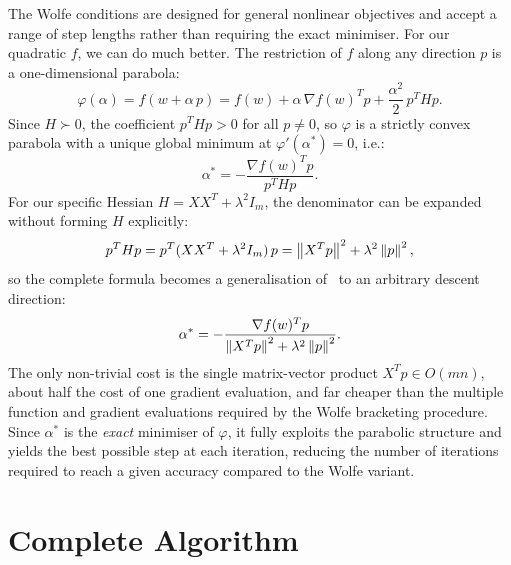 \noindent The Wolfe conditions are designed for general nonlinear objectives and
accept a range of step lengths rather than requiring the exact minimiser. For our
quadratic $f$, we can do much better. The restriction of $f$ along any direction
$p$ is a one-dimensional parabola:
\begin{equation}
\label{eq:phi_parabola}
    \varphi(\alpha) = f(w + \alpha\,p)
    = f(w) + \alpha\,\nabla f(w)^T p + \frac{\alpha^2}{2}\,p^T H p.
\end{equation}
Since $H \succ 0$, the coefficient $p^T H p > 0$ for all $p \neq 0$, so
$\varphi$ is a strictly convex parabola with a unique global minimum at
$\varphi'(\alpha^*) = 0$, i.e.:
\begin{equation}
\label{eq:exact_alpha}
    \alpha^* = -\frac{\nabla f(w)^T p}{\,p^T H p\,}.
\end{equation}
For our specific Hessian $H = XX^T + \lambda^2 I_m$, the denominator can be
expanded without forming $H$ explicitly:
\begin{equation}
    p^T H p = p^T (XX^T + \lambda^2 I_m)\,p
    = \left\|X^T p\right\|^2 + \lambda^2\left\|p\right\|^2,
\end{equation}
so the complete formula becomes a generalisation
of~\cite[Eq.~3.25]{nocedal2006numerical} to an arbitrary descent direction:
\begin{equation}
\label{eq:exact_alpha_expanded}
    \alpha^* = -\frac{\nabla f(w)^T p}{\left\|X^T p\right\|^2 + \lambda^2\left\|p\right\|^2}.
\end{equation}
The only non-trivial cost is the single matrix-vector product $X^T p \in O(mn)$,
about half the cost of one gradient evaluation, and far cheaper than the
multiple function and gradient evaluations required by the Wolfe bracketing
procedure. Since $\alpha^*$ is the \emph{exact} minimiser of $\varphi$, it fully
exploits the parabolic structure and yields the best possible step at each
iteration, reducing the number of iterations required to reach a given
accuracy compared to the Wolfe variant.


\section{Complete Algorithm}

